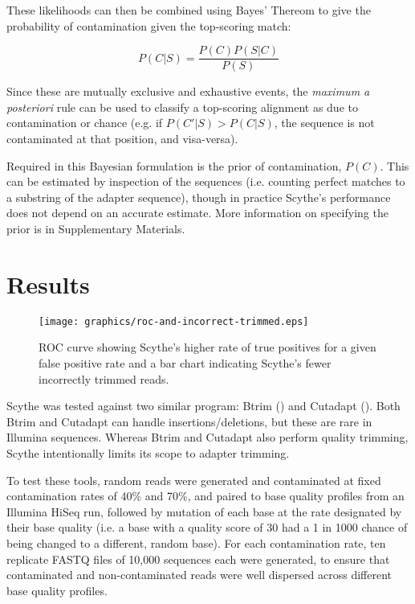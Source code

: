 \documentclass{bioinfo}
\begin{document}
\begin{methods}
These likelihoods can then be combined using Bayes' Thereom to give
the probability of contamination given the top-scoring match:

$$ P(C|S) = \frac{P(C) P(S|C)}{P(S)} $$

Since these are mutually exclusive and exhaustive events, the
\emph{maximum a posteriori} rule can be used to classify a top-scoring
alignment as due to contamination or chance (e.g. if $P(C'|S) >
P(C|S)$, the sequence is not contaminated at that position, and
visa-versa).

Required in this Bayesian formulation is the prior of contamination,
$P(C)$. This can be estimated by inspection of the sequences
(i.e. counting perfect matches to a substring of the adapter
sequence), though in practice Scythe's performance does not depend on
an accurate estimate. More information on specifying the prior is in
Supplementary Materials.

\section{Results}
\begin{centering}
\begin{figure*}[!tpb]
\texttt{[image: graphics/roc-and-incorrect-trimmed.eps]}
\caption{ROC curve showing Scythe's higher rate of true positives for
  a given false positive rate and a bar chart indicating Scythe's
  fewer incorrectly trimmed reads.}\label{fig:02}
\end{figure*}
\end{centering}

Scythe was tested against two similar program: Btrim
(\citealp{pmid21651976}) and Cutadapt (\citealp{EJ200}). Both Btrim
and Cutadapt can handle insertions/deletions, but these are rare in
Illumina sequences. Whereas Btrim and Cutadapt also perform quality
trimming, Scythe intentionally limits its scope to adapter trimming.

To test these tools, random reads were generated and contaminated at
fixed contamination rates of 40\% and 70\%, and paired to base quality
profiles from an Illumina HiSeq run, followed by mutation of each base
at the rate designated by their base quality (i.e. a base with a
quality score of 30 had a 1 in 1000 chance of being changed to a
different, random base). For each contamination rate, ten replicate
FASTQ files of 10,000 sequences each were generated, to ensure that
contaminated and non-contaminated reads were well dispersed across
different base quality profiles.


\end{methods}
\end{document}
